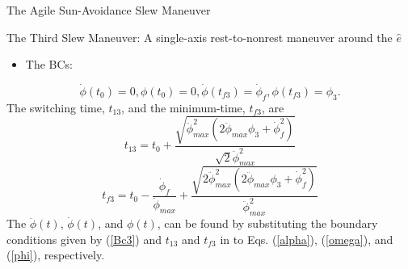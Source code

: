 \documentclass{beamer}
\begin{document}
\begin{frame}{The Agile Sun-Avoidance Slew Maneuver}
\begin{block}{The Third Slew Maneuver: A single-axis rest-to-nonrest maneuver around the $\hat{e}$}
\begin{itemize}
 \item The BCs: 
\end{itemize}
\begin{equation}\label{Bc3}
\dot{\phi}(t_0)=0,\phi(t_0)=0, \dot{\phi}(t_{f3})=\dot{\phi}_{f},\phi(t_{f3})=\phi_3.
\end{equation}
 The switching time, $t_{13}$, and the minimum-time, $t_{f3}$, are
\begin{equation}\label{t31}
t_{13}=t_0+\frac{\sqrt{\ddot{\phi}_{max}^2(2\ddot{\phi}_{max}\phi_3+\dot{\phi}_{f}^2)}}{\sqrt{2}\ddot{\phi}_{max}^2}
\end{equation}
\begin{equation}\label{tf3}
t_{f3}=t_0-\frac{\dot{\phi}_{f}}{\ddot{\phi}_{max}}+\frac{\sqrt{2\ddot{\phi}_{max}^2(2\ddot{\phi}_{max}\phi_3+\dot{\phi}_{f}^2)}}{\ddot{\phi}_{max}^2}
\end{equation}
The $\ddot{\phi}(t)$, $\dot{\phi}(t)$, and  $\phi(t)$,  can be found by substituting the boundary conditions given by (\ref{Bc3}) and $t_{13}$ and $t_{f3}$ in to Eqs. (\ref{alpha}), (\ref{omega}), and (\ref{phi}), respectively.
\end{block}
\end{frame}
%		
%		
\end{document}
